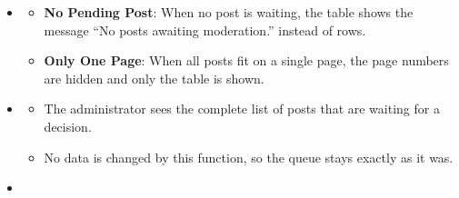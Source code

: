 \begin{itemize}[leftmargin=1.6em,topsep=4pt,itemsep=3pt,parsep=0pt,label=$\bullet$]
\begin{itemize}[leftmargin=2.2em,topsep=2pt,itemsep=3pt,parsep=0pt,label=$\circ$]
\begin{itemize}[leftmargin=2.2em,topsep=2pt,itemsep=3pt,parsep=0pt,label=$\blacksquare$]
                \end{itemize}
            \item \textbf{Read the Score Colour}: The score badge uses a colour that reflects the risk level.
                \begin{itemize}[leftmargin=2.2em,topsep=2pt,itemsep=3pt,parsep=0pt,label=$\blacksquare$]
                    \item A score of 0.80 or more is shown in red, a score from 0.30 to 0.79 is shown in amber and a score below 0.30 is shown in green.
                \end{itemize}
            \item \textbf{Move Between Pages}: When there is more than one page, the user uses the page numbers or the \textbf{Previous} and \textbf{Next} buttons at the bottom of the list, and the counter shows ``Page x of y (n total)''.
            \item \textbf{Choose an Item}: The user opens, approves or rejects a post with the action buttons at the end of the row (see \textbf{View Moderation Item Details} and \textbf{Resolve Moderation Item}).
        \end{itemize}
    \item {}
        \begin{itemize}[leftmargin=2.2em,topsep=2pt,itemsep=3pt,parsep=0pt,label=$\circ$]
            \item \textbf{No Pending Post}: When no post is waiting, the table shows the message ``No posts awaiting moderation.'' instead of rows.
            \item \textbf{Only One Page}: When all posts fit on a single page, the page numbers are hidden and only the table is shown.
        \end{itemize}
    \item {}
        \begin{itemize}[leftmargin=2.2em,topsep=2pt,itemsep=3pt,parsep=0pt,label=$\circ$]
            \item The administrator sees the complete list of posts that are waiting for a decision.
            \item No data is changed by this function, so the queue stays exactly as it was.
        \end{itemize}
    \item {}
        \begin{itemize}[leftmargin=2.2em,topsep=2pt,itemsep=3pt,parsep=0pt,label=$\circ$]

\end{itemize}
\end{itemize}
